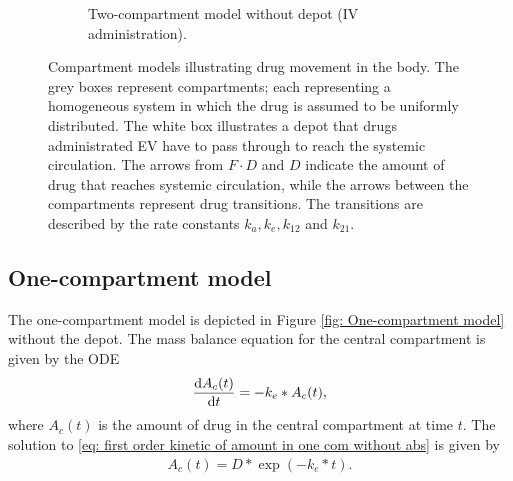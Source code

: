 \begin{figure}[h]
\begin{subfigure}[b]{0.48\textwidth}
        \caption{Two-compartment model without depot (IV administration).}
        \label{fig: Two-compartment model}
    \end{subfigure}
    \caption{Compartment models illustrating drug movement in the body. The grey boxes represent compartments; each representing a homogeneous system in which the drug is assumed to be uniformly distributed. The white box illustrates a depot that drugs administrated EV have to pass through to reach the systemic circulation. The arrows from $F \cdot D$ and $D$ indicate the amount of drug that reaches systemic circulation, while the arrows between the compartments represent drug transitions. The transitions are described by the rate constants $k_a, k_e, k_{12}$ and $k_{21}$.}
    \label{fig: Compartment models}
\end{figure}

\subsection{One-compartment model}
The one-compartment model is depicted in Figure \ref{fig: One-compartment model} without the depot. The mass balance equation for the central compartment is given by the ODE
\begin{align} \label{eq: first order kinetic of amount in one com without abs}
    \frac{\mathrm{d} A_{c}(t)}{\mathrm{d}t} = - k_e * A_{c}(t),
\end{align}
where $A_{c}(t)$ is the amount of drug in the central compartment at time $t$. The solution to \eqref{eq: first order kinetic of amount in one com without abs} is given by
\begin{align} \label{eq: sol to first order kinetic of amount in one com without abs}
    A_{c}(t) = D * \exp(-k_e * t). 
\end{align} 

